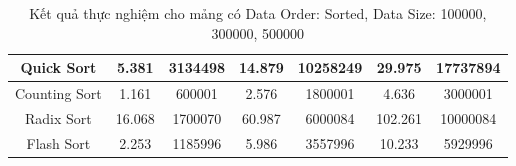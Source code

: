 \begin{table}[H]
{\begin{tabular}{|ccccccc|}
\multicolumn{1}{|c|}{Quick Sort} & \multicolumn{1}{c|}{5.381} & \multicolumn{1}{c|}{3134498} & \multicolumn{1}{c|}{14.879} & \multicolumn{1}{c|}{10258249} & \multicolumn{1}{c|}{29.975} & \multicolumn{1}{c|}{17737894} \\ \hline
\multicolumn{1}{|c|}{Counting Sort} & \multicolumn{1}{c|}{1.161} & \multicolumn{1}{c|}{600001} & \multicolumn{1}{c|}{2.576} & \multicolumn{1}{c|}{1800001} & \multicolumn{1}{c|}{4.636} & \multicolumn{1}{c|}{3000001} \\ \hline
\multicolumn{1}{|c|}{Radix Sort} & \multicolumn{1}{c|}{16.068} & \multicolumn{1}{c|}{1700070} & \multicolumn{1}{c|}{60.987} & \multicolumn{1}{c|}{6000084} & \multicolumn{1}{c|}{102.261} & \multicolumn{1}{c|}{10000084} \\ \hline
\multicolumn{1}{|c|}{Flash Sort} & \multicolumn{1}{c|}{2.253} & \multicolumn{1}{c|}{1185996} & \multicolumn{1}{c|}{5.986} & \multicolumn{1}{c|}{3557996} & \multicolumn{1}{c|}{10.233} & \multicolumn{1}{c|}{5929996} \\ \hline
\end{tabular}%
}
\caption{Kết quả thực nghiệm cho mảng có Data Order: Sorted, Data Size: 100000, 300000, 500000}
\label{tab:sorted_100000_300000_500000}
\end{table}

